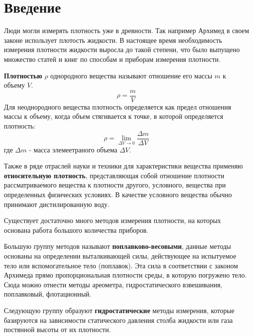 \documentclass[russian, utf8]{eskdtext}
\begin{document}
\tableofcontents
\thispagestyle{empty}
\newpage

{\section*{Введение}
}

Люди могли измерять плотность уже в древности. Так например Архимед в своем законе использует плотость жидкости. В настоящее время необходимость измерения плотности жидкости выросла до такой степени, что было выпущено множество статей и книг по способам и приборам измерения плотности. \par
\textbf{Плотностью} $\rho$ однородного вещества называют отношение его массы $m$ к объему $V$.
\begin{equation}
	\rho = \frac{m}{V}
\end{equation}
Для неоднородного вещества плотность определяется как предел отношения массы к объему, когда объем стягивается к точке, в которой определяется плотность:
\begin{equation}
	\rho = \lim_{\Delta V\rightarrow0}{\frac{\Delta m}{\Delta V}}
\end{equation}
где $\Delta m$ - масса элемеетраного объема $\Delta V$.

Также в ряде отраслей науки и техники для характеристики вещества применяю \textbf{относительную плотность}, представляющая собой отношение плотности рассматриваемого вещества к плотности другого, условного, вещества при определенных физических условиях. В качестве условного вещества обычно принимают дистилированную воду. \par

Существует достаточно много методов измерения плотности, на которых основана работа большого количества приборов. \par

Большую группу методов называют \textbf{поплавково-весовыми}, данные методы основаны на определении выталкивающей силы, действующее на испытуемое тело или вспомогательное тело (поплавок). Эта сила в соответствии с законом Архимеда прямо пропорциональная плотности среды, в которую погружено тело. Сюда можно отнести методы ареометра, гидростатического взвешивания, поплавковый, флотационный. \par

Следующую группу образуют \textbf{гидростатические} методы измерения, которые базируются на зависимости статического давления столба жидкости или газа постянной высоты от их плотности. \par
\end{document}
